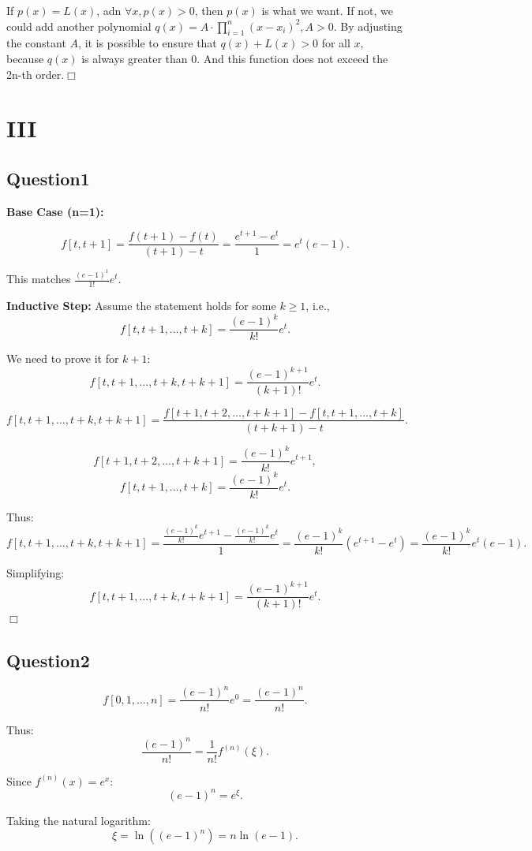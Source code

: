 \documentclass[a4paper]{article}
\begin{document}
If $p(x) = L(x)$, adn $\forall x , p(x)>0$, then $p(x)$ is what we want. If not, we could add another polynomial $q(x) = A\cdot \prod_{i=1}^{n}(x-x_i)^{2},A>0$.
By adjusting the constant \( A \), it is possible to ensure that \( q(x) + L(x) > 0 \) for all \( x \), because \( q(x) \) is always greater than 0.
And this function does not exceed the 2n-th order.\hfill $\Box$

\section*{III}
\subsection*{Question1}

\textbf{Base Case (n=1):}

\[
f[t, t+1] = \frac{f(t+1) - f(t)}{(t+1) - t} = \frac{e^{t+1} - e^t}{1} = e^t (e - 1).
\]

This matches \( \frac{(e-1)^1}{1!} e^t \).

\textbf{Inductive Step:}
Assume the statement holds for some \( k \geq 1 \), i.e.,
\[
f[t, t+1, \ldots, t+k] = \frac{(e-1)^k}{k!} e^t.
\]

We need to prove it for \( k+1 \):
\[
f[t, t+1, \ldots, t+k, t+k+1] = \frac{(e-1)^{k+1}}{(k+1)!} e^t.
\]

\[
f[t, t+1, \ldots, t+k, t+k+1] = \frac{f[t+1, t+2, \ldots, t+k+1] - f[t, t+1, \ldots, t+k]}{(t+k+1) - t}.
\]

\[
f[t+1, t+2, \ldots, t+k+1] = \frac{(e-1)^k}{k!} e^{t+1},
\]
\[
f[t, t+1, \ldots, t+k] = \frac{(e-1)^k}{k!} e^t.
\]

Thus:
\[
f[t, t+1, \ldots, t+k, t+k+1] = \frac{\frac{(e-1)^k}{k!} e^{t+1} - \frac{(e-1)^k}{k!} e^t}{1} = \frac{(e-1)^k}{k!} (e^{t+1} - e^t) = \frac{(e-1)^k}{k!} e^t (e - 1).
\]

Simplifying:
\[
f[t, t+1, \ldots, t+k, t+k+1] = \frac{(e-1)^{k+1}}{(k+1)!} e^t.
\]\hfill $\Box$
\subsection*{Question2}
\[
f[0, 1, \ldots, n] = \frac{(e-1)^n}{n!} e^0 = \frac{(e-1)^n}{n!}.
\]

Thus:
\[
\frac{(e-1)^n}{n!} = \frac{1}{n!} f^{(n)}(\xi).
\]

Since \( f^{(n)}(x) = e^x \):
\[
(e-1)^n = e^\xi.
\]

Taking the natural logarithm:
\[
\xi = \ln((e-1)^n) = n \ln(e-1).
\]
\end{document}
